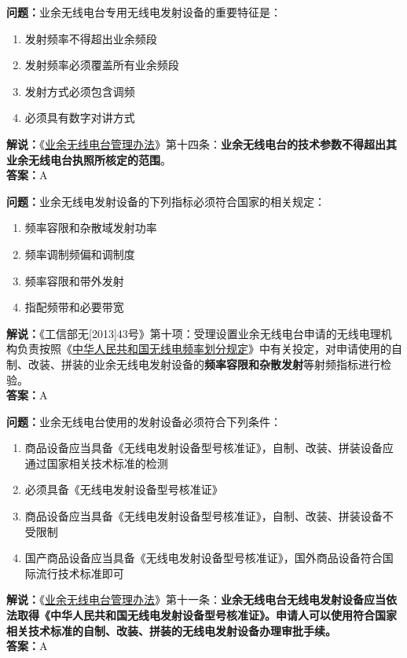 \textbf{问题：}业余无线电台专用无线电发射设备的重要特征是：
\begin{enumerate}[label=\Alph*), leftmargin=1cm]
	\item 发射频率不得超出业余频段
	\item 发射频率必须覆盖所有业余频段
	\item 发射方式必须包含调频
	\item 必须具有数字对讲方式
\end{enumerate}
\textbf{解说：}《\href{https://www.miit.gov.cn/jgsj/zfs/bmgz/art/2020/art_147b69815b3641caad9047735f94c860.html}{业余无线电台管理办法}》第十四条：\textbf{业余无线电台的技术参数不得超出其业余无线电台执照所核定的范围}。\\\textbf{答案：}A%

\textbf{问题：}业余无线电发射设备的下列指标必须符合国家的相关规定：
\begin{enumerate}[label=\Alph*), leftmargin=1cm]
	\item 频率容限和杂散域发射功率
	\item 频率调制频偏和调制度
	\item 频率容限和带外发射
	\item 指配频带和必要带宽
\end{enumerate}
\textbf{解说：}《工信部无[2013]43号》第十项：受理设置业余无线电台申请的无线电理机构负责按照《\href{https://www.miit.gov.cn/zwgk/zcwj/wjfb/txy/art/2020/art_066386284cd2449493586c81ccafed11.html}{中华人民共和国无线电频率划分规定}》中有关投定，对申请使用的自制、改装、拼装的业余无线电发射设备的\textbf{频率容限和杂散发射}等射频指标进行检验。\\\textbf{答案：}A


\textbf{问题：}业余无线电台使用的发射设备必须符合下列条件：
\begin{enumerate}[label=\Alph*), leftmargin=1cm]
	\item 商品设备应当具备《无线电发射设备型号核准证》，自制、改装、拼装设备应通过国家相关技术标准的检测
	\item 必须具备《无线电发射设备型号核准证》
	\item 商品设备应当具备《无线电发射设备型号核准证》，自制、改装、拼装设备不受限制
	\item 国产商品设备应当具备《无线电发射设备型号核准证》，国外商品设备符合国际流行技术标准即可
\end{enumerate}
\textbf{解说：}《\href{https://www.miit.gov.cn/jgsj/zfs/bmgz/art/2020/art_147b69815b3641caad9047735f94c860.html}{业余无线电台管理办法}》第十一条：\textbf{业余无线电台无线电发射设备应当依法取得《中华人民共和国无线电发射设备型号核准证》。申请人可以使用符合国家相关技术标准的自制、改装、拼装的无线电发射设备办理审批手续。}\\\textbf{答案：}A


